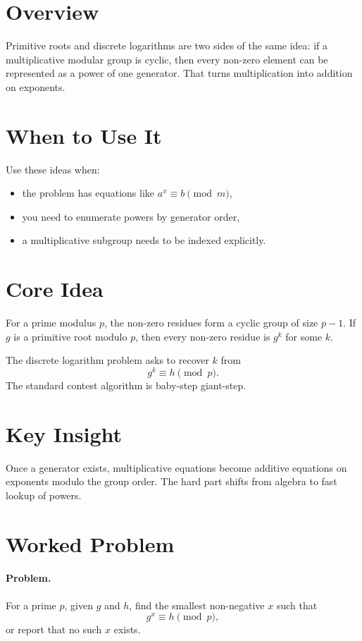 \section*{Overview}

Primitive roots and discrete logarithms are two sides of the same idea: if a multiplicative modular group is cyclic,
then every non-zero element can be represented as a power of one generator. That turns multiplication into addition on
exponents.

\section*{When to Use It}

Use these ideas when:

\begin{itemize}
  \item the problem has equations like \(a^x \equiv b \pmod m\),
  \item you need to enumerate powers by generator order,
  \item a multiplicative subgroup needs to be indexed explicitly.
\end{itemize}

\section*{Core Idea}

For a prime modulus \(p\), the non-zero residues form a cyclic group of size \(p-1\). If \(g\) is a primitive root
modulo \(p\), then every non-zero residue is \(g^k\) for some \(k\).

The discrete logarithm problem asks to recover \(k\) from
\[
g^k \equiv h \pmod p.
\]
The standard contest algorithm is baby-step giant-step.

\section*{Key Insight}

Once a generator exists, multiplicative equations become additive equations on exponents modulo the group order. The
hard part shifts from algebra to fast lookup of powers.

\section*{Worked Problem}

\paragraph{Problem.}
For a prime \(p\), given \(g\) and \(h\), find the smallest non-negative \(x\) such that
\[
g^x \equiv h \pmod p,
\]
or report that no such \(x\) exists.

